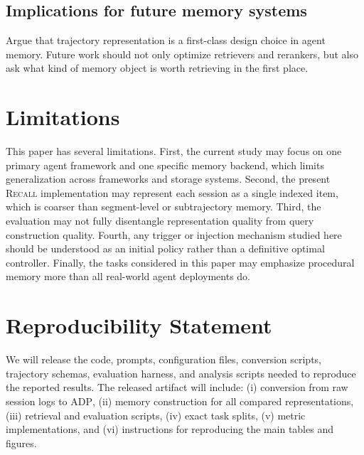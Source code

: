 \documentclass{article}
\newcommand{\Recall}{\textsc{Recall}}
\newcommand{\ADP}{\textsc{ADP}}
\begin{document}
\subsection{Implications for future memory systems}
Argue that trajectory representation is a first-class design choice in agent memory.
Future work should not only optimize retrievers and rerankers, but also ask what kind of memory object is
worth retrieving in the first place.

\section{Limitations}
This paper has several limitations.
First, the current study may focus on one primary agent framework and one specific memory backend, which
limits generalization across frameworks and storage systems.
Second, the present \Recall{} implementation may represent each session as a single indexed item, which is
coarser than segment-level or subtrajectory memory.
Third, the evaluation may not fully disentangle representation quality from query construction quality.
Fourth, any trigger or injection mechanism studied here should be understood as an initial policy rather
than a definitive optimal controller.
Finally, the tasks considered in this paper may emphasize procedural memory more than all real-world agent
deployments do.

\section{Reproducibility Statement}
We will release the code, prompts, configuration files, conversion scripts, trajectory schemas,
evaluation harness, and analysis scripts needed to reproduce the reported results.
The released artifact will include:
(i) conversion from raw session logs to \ADP{},
(ii) memory construction for all compared representations,
(iii) retrieval and evaluation scripts,
(iv) exact task splits,
(v) metric implementations, and
(vi) instructions for reproducing the main tables and figures.

\end{document}
